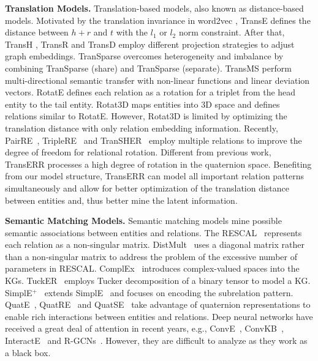 \documentclass[10pt, a4paper]{article}
\begin{document}
\textbf{Translation Models.} Translation-based models, also known as distance-based models. Motivated by the translation invariance in word2vec \cite{19mikolov2013efficient}, TransE \cite{7bordes2013translating}  defines the distance between $h + r$ and $t$  with the $l_1$ or $l_2$ norm constraint. After that, TransH \cite{81wang2014knowledge}, TransR \cite{9lin2015learning} and TransD \cite{10ji2015knowledge}  employ different projection strategies to adjust graph embeddings. TranSparse \cite{20ji2016knowledge} overcomes heterogeneity and imbalance by combining TranSparse (share) and TranSparse (separate). TransMS \cite{21yang2019transms} perform multi-directional semantic transfer with non-linear functions and linear deviation vectors. RotatE \cite{31sun2019rotate} defines each relation as a rotation for a triplet from the head entity to the tail entity. Rotat3D \cite{15gao2020rotate3d} maps entities into 3D space and defines relations similar to RotatE. However, Rotat3D is limited by optimizing the translation distance with only relation embedding information. Recently, PairRE~\cite{52chao2020pairre}, TripleRE~\cite{yu2022triplere} and TranSHER~\cite{li-etal-2022-transher} employ multiple relations to improve the degree of freedom for relational rotation. Different from previous work, TransERR processes a high degree of rotation in the quaternion space.  Benefiting from our model structure, TransERR can model all important relation patterns simultaneously and allow for better optimization of the translation distance between entities and, thus better mine the latent information.




\textbf{Semantic Matching Models.}
Semantic matching  models mine possible semantic associations between entities and relations. The RESCAL~\cite{27nickel2011three} represents each relation as a non-singular matrix. DistMult~\cite{29yang2014embedding} uses a diagonal matrix rather than a non-singular matrix to address the problem of the excessive number of parameters in RESCAL. ComplEx~\cite{14trouillon2016complex} introduces complex-valued spaces into the KGs. TuckER~\cite{TuckER2019tucker} employs Tucker decomposition of a binary tensor to model a KG. SimplE$^+$~\cite{58fatemi2019improved} extends SimplE~\cite{kazemi2018simple} and focuses on encoding the subrelation pattern. QuatE~\cite{zhang2019quaternion}, QuatRE~\cite{nguyen2022quatre} and QuatSE~\cite{li2022quatse} take advantage of quaternion representations to enable rich interactions between entities and relations. Deep neural networks have received a great deal of attention in recent years, e.g., ConvE~\cite{dettmers2018convolutional}, ConvKB~\cite{nguyen2017novel}, InteractE~\cite{vashishth2020interacte} and R-GCNs~\cite{schlichtkrull2018modeling}. However, they are difficult to analyze as they work as a black box.
\end{document}

